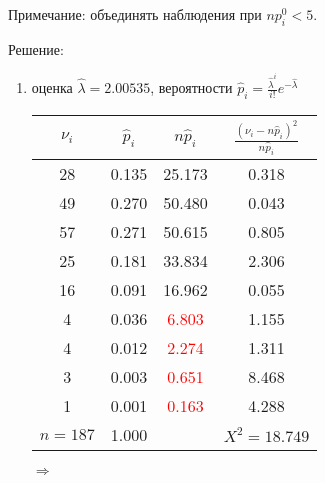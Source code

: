 \documentclass[a4paper,12pt]{article}
\newif\ifsolutions
\begin{document}
Примечание: объединять наблюдения при $n p_i^0 < 5$.

\ifsolutions Решение: \par
    \begin{enumerate}
        \item оценка $\widehat{\lambda} = 2.00535$, вероятности $\widehat{p}_i = \frac{\widehat{\lambda}^i}{i!} e^{- \widehat{\lambda}}$

              \begin{tabular}{|c|c|c|c|}
                  \hline
                  $\nu_i$   & $\widehat{p}_i$ & $n \widehat{p}_i$      & $\frac{(\nu_i - n \widehat{p}_i)^2}{n \widehat{p}_i}$ \\
                  \hline
                  28        & 0.135           & 25.173                 & 0.318                                                 \\
                  49        & 0.270           & 50.480                 & 0.043                                                 \\
                  57        & 0.271           & 50.615                 & 0.805                                                 \\
                  25        & 0.181           & 33.834                 & 2.306                                                 \\
                  16        & 0.091           & 16.962                 & 0.055                                                 \\
                  4         & 0.036           & \textcolor{red}{6.803} & 1.155                                                 \\
                  4         & 0.012           & \textcolor{red}{2.274} & 1.311                                                 \\
                  3         & 0.003           & \textcolor{red}{0.651} & 8.468                                                 \\
                  1         & 0.001           & \textcolor{red}{0.163} & 4.288                                                 \\
                  \hline
                  $n = 187$ & 1.000           &                        & $X^2 = 18.749$                                        \\
                  \hline
              \end{tabular}
              $\Rightarrow$
              \begin{tabular}{|c|c|c|c|c|}

\end{tabular}
\end{enumerate}
\end{document}
